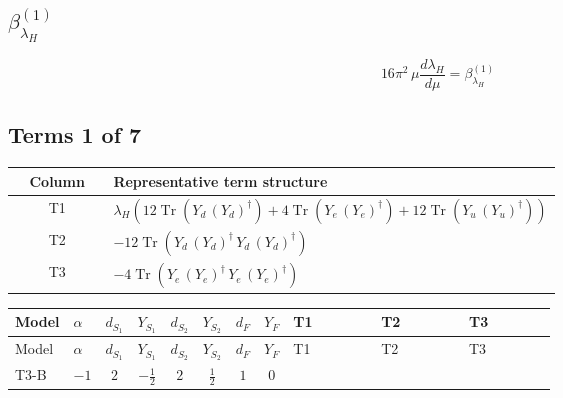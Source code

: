 \documentclass[8pt]{article}
\begin{document}
\begin{landscape}
\section*{$\beta_{\lambda_H}^{(1)}$}
\[16\pi^2\,\mu\frac{d \lambda_H}{d\mu}=\beta_{\lambda_H}^{(1)}\]
\subsection*{Terms 1 of 7}
\begin{center}
\begin{tabular}{@{}c >{\raggedright\arraybackslash}p{0.82\linewidth}@{}}
\toprule
Column & Representative term structure \\
\midrule
T1 & \(\displaystyle {\lambda_H} (12 \operatorname{Tr}\!\left({Y_d}\,\left({Y_d}\right)^{\dagger}\right)+4 \operatorname{Tr}\!\left({Y_e}\,\left({Y_e}\right)^{\dagger}\right)+12 \operatorname{Tr}\!\left({Y_u}\,\left({Y_u}\right)^{\dagger}\right))\) \\
\midrule
T2 & \(\displaystyle -12 \operatorname{Tr}\!\left({Y_d}\,\left({Y_d}\right)^{\dagger}\,{Y_d}\,\left({Y_d}\right)^{\dagger}\right)\) \\
\midrule
T3 & \(\displaystyle -4 \operatorname{Tr}\!\left({Y_e}\,\left({Y_e}\right)^{\dagger}\,{Y_e}\,\left({Y_e}\right)^{\dagger}\right)\) \\
\midrule
\bottomrule
\end{tabular}
\end{center}
\smallskip
\tiny
\begin{longtable}{@{}llcccccc >{\raggedright\arraybackslash}p{0.21\linewidth} >{\raggedright\arraybackslash}p{0.21\linewidth} >{\raggedright\arraybackslash}p{0.21\linewidth}@{}}
\toprule
Model & $\alpha$ & $d_{S_1}$ & $Y_{S_1}$ & $d_{S_2}$ & $Y_{S_2}$ & $d_F$ & $Y_F$ & T1 & T2 & T3 \\
\midrule
\endfirsthead
\toprule
Model & $\alpha$ & $d_{S_1}$ & $Y_{S_1}$ & $d_{S_2}$ & $Y_{S_2}$ & $d_F$ & $Y_F$ & T1 & T2 & T3 \\
\midrule
\endhead
T3-B & $-1$ & $2$ & $-\frac{1}{2}$ & $2$ & $\frac{1}{2}$ & $1$ & $0$ & \scriptsize\adjustbox{max width=\linewidth}{$\begin{gathered} {\lambda_H} (12 \operatorname{Tr}\!\left({Y_d}\,\left({Y_d}\right)^{\dagger}\right)+4 \operatorname{Tr}\!\left({Y_e}\,\left({Y_e}\right)^{\dagger}\right)+12 \operatorname{Tr}\!\left({Y_u}\,\left({Y_u}\right)^{\dagger}\right))\end{gathered}$} & \scriptsize\adjustbox{max width=\linewidth}{$\begin{gathered} -12 \operatorname{Tr}\!\left({Y_d}\,\left({Y_d}\right)^{\dagger}\,{Y_d}\,\left({Y_d}\right)^{\dagger}\right)\end{gathered}$} & \scriptsize\adjustbox{max width=\linewidth}{$\begin{gathered} -4 \operatorname{Tr}\!\left({Y_e}\,\left({Y_e}\right)^{\dagger}\,{Y_e}\,\left({Y_e}\right)^{\dagger}\right)\end{gathered}$} \\

\end{longtable}
\end{landscape}
\end{document}
